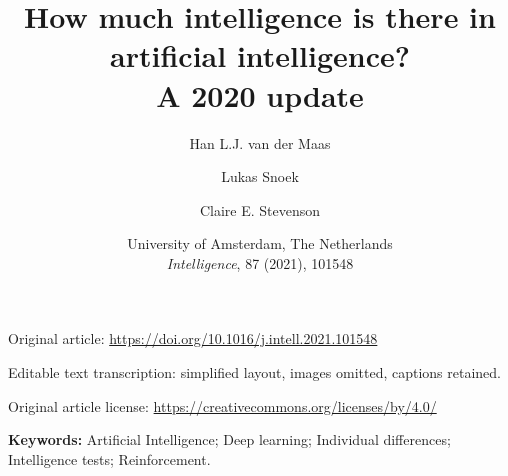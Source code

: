 \documentclass[11pt,a4paper]{article}
\title{%
  How much intelligence is there in artificial intelligence?\\
  A 2020 update
}
\author{%
  Han L.J. van der Maas
  \and Lukas Snoek
  \and Claire E. Stevenson
}
\date{%
  University of Amsterdam, The Netherlands\\
  \textit{Intelligence}, 87 (2021), 101548
}
\begin{document}
\maketitle

\begin{center}
\small
Original article:
\url{https://doi.org/10.1016/j.intell.2021.101548}

Editable text transcription: simplified layout, images omitted,
captions retained.

Original article license:
\url{https://creativecommons.org/licenses/by/4.0/}
\end{center}

\begin{abstract}

\end{abstract}

\noindent
\textbf{Keywords:}
Artificial Intelligence;
Deep learning;
Individual differences;
Intelligence tests;
Reinforcement.











\end{document}
